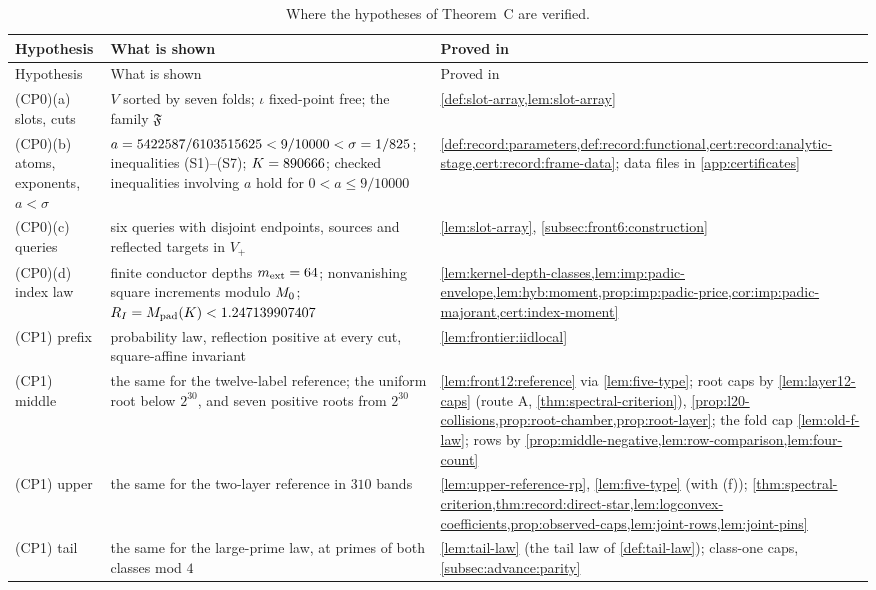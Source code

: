 {\small
\begin{longtable}{@{}>{\raggedright\arraybackslash}p{2.75cm}>{\raggedright\arraybackslash}p{6.1cm}>{\raggedright\arraybackslash}p{5.95cm}@{}}
\caption{Where the hypotheses of Theorem~C are verified.}\label{tab:hypotheses}\\
\toprule
Hypothesis & What is shown & Proved in\\
\midrule
\endfirsthead
\toprule
Hypothesis & What is shown & Proved in\\
\midrule
\endhead
\bottomrule
\endfoot
(CP0)(a) slots, cuts & $V$ sorted by seven folds; $\iota$ fixed-point free; the family $\mathfrak F$ & \cref{def:slot-array,lem:slot-array}\\
(CP0)(b) atoms, exponents, $a<\sigma$ & $a=5422587/6103515625<9/10000<\sigma=1/825$; inequalities (S1)--(S7); $K=890666$; checked inequalities involving $a$ hold for $0<a\le9/10000$ & \cref{def:record:parameters,def:record:functional,cert:record:analytic-stage,cert:record:frame-data}; data files in \cref{app:certificates}\\
(CP0)(c) queries & six queries with disjoint endpoints, sources and reflected targets in $V_+$ & \cref{lem:slot-array}, \cref{subsec:front6:construction}\\
(CP0)(d) index law & finite conductor depths $m_{\rm ext}=64$; nonvanishing square increments modulo $M_0$; $R_I=M_{\rm pad}(K)<1.247139907407$ & \cref{lem:kernel-depth-classes,lem:imp:padic-envelope,lem:hyb:moment,prop:imp:padic-price,cor:imp:padic-majorant,cert:index-moment}\\
(CP1) prefix & probability law, reflection positive at every cut, square-affine invariant & \cref{lem:frontier:iidlocal}\\
(CP1) middle & the same for the twelve-label reference; the uniform root below $2^{30}$, and seven positive roots from $2^{30}$ & \cref{lem:front12:reference} via \cref{lem:five-type}; root caps by \cref{lem:layer12-caps} (route A, \cref{thm:spectral-criterion}), \cref{prop:l20-collisions,prop:root-chamber,prop:root-layer}; the fold cap \cref{lem:old-f-law}; rows by \cref{prop:middle-negative,lem:row-comparison,lem:four-count}\\
(CP1) upper & the same for the two-layer reference in $310$ bands & \cref{lem:upper-reference-rp}, \cref{lem:five-type} (with (f)); \cref{thm:spectral-criterion,thm:record:direct-star,lem:logconvex-coefficients,prop:observed-caps,lem:joint-rows,lem:joint-pins}\\
(CP1) tail & the same for the large-prime law, at primes of both classes mod $4$ & \cref{lem:tail-law} (the tail law of \cref{def:tail-law}); class-one caps, \cref{subsec:advance:parity}\\

\end{longtable}}
